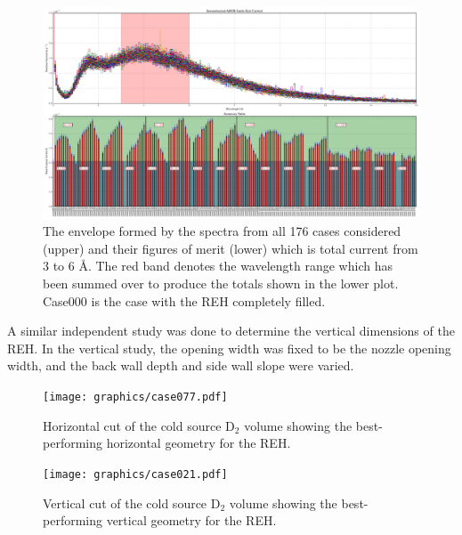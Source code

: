 \documentclass[preprint,12pt]{elsarticle}
\begin{document}
\begin{figure}
\begin{center}
\includegraphics[scale=0.26,trim={0cm 0cm 0cm 0cm},clip]{graphics/parametric_REH.pdf}
\end{center}
\caption{\label{parametric_REH}The envelope formed by the spectra from all 176 cases considered (upper) and their figures of merit (lower) which is total current from 3 to 6 \AA{}.  The red band denotes the wavelength range which has been summed over to produce the totals shown in the lower plot.  Case000 is the case with the REH completely filled.}
\end{figure}

A similar independent study was done to determine the vertical dimensions of the REH.  In the vertical study, the opening width was fixed to be the nozzle opening width, and the back wall depth and side wall slope were varied.

\begin{figure}[h]
\begin{minipage}{11pc}
\begin{center}
\texttt{[image: graphics/case077.pdf]}
\end{center}
\caption{\label{case_horiz}Horizontal cut of the cold source D$_2$ volume showing the best-performing horizontal geometry for the REH.}
\end{minipage} \hfill%
\begin{minipage}{11pc}
\begin{center}
\texttt{[image: graphics/case021.pdf]}
\end{center}
\caption{\label{case_vert}Vertical cut of the cold source D$_2$ volume showing the best-performing vertical geometry for the REH.}
\end{minipage} 
\end{figure}
\end{document}
